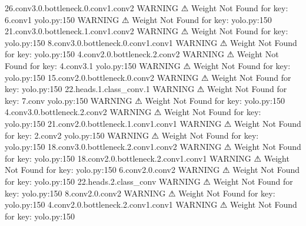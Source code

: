                              26.conv3.0.bottleneck.0.conv1.conv2                  
                    WARNING  ⚠ Weight Not Found for key: 6.conv1       yolo.py:150
                    WARNING  ⚠ Weight Not Found for key:               yolo.py:150
                             21.conv3.0.bottleneck.1.conv1.conv2                  
                    WARNING  ⚠ Weight Not Found for key:               yolo.py:150
                             8.conv3.0.bottleneck.0.conv1.conv1                   
                    WARNING  ⚠ Weight Not Found for key:               yolo.py:150
                             4.conv2.0.bottleneck.2.conv2                         
                    WARNING  ⚠ Weight Not Found for key: 4.conv3.1     yolo.py:150
                    WARNING  ⚠ Weight Not Found for key:               yolo.py:150
                             15.conv2.0.bottleneck.0.conv2                        
                    WARNING  ⚠ Weight Not Found for key:               yolo.py:150
                             22.heads.1.class_conv.1                              
                    WARNING  ⚠ Weight Not Found for key: 7.conv        yolo.py:150
                    WARNING  ⚠ Weight Not Found for key:               yolo.py:150
                             4.conv3.0.bottleneck.2.conv2                         
                    WARNING  ⚠ Weight Not Found for key:               yolo.py:150
                             21.conv2.0.bottleneck.1.conv1.conv1                  
                    WARNING  ⚠ Weight Not Found for key: 2.conv2       yolo.py:150
                    WARNING  ⚠ Weight Not Found for key:               yolo.py:150
                             18.conv3.0.bottleneck.2.conv1.conv2                  
                    WARNING  ⚠ Weight Not Found for key:               yolo.py:150
                             18.conv2.0.bottleneck.2.conv1.conv1                  
                    WARNING  ⚠ Weight Not Found for key:               yolo.py:150
                             6.conv2.0.conv2                                      
                    WARNING  ⚠ Weight Not Found for key:               yolo.py:150
                             22.heads.2.class_conv                                
                    WARNING  ⚠ Weight Not Found for key:               yolo.py:150
                             8.conv2.0.conv2                                      
                    WARNING  ⚠ Weight Not Found for key:               yolo.py:150
                             4.conv2.0.bottleneck.2.conv1.conv1                   
                    WARNING  ⚠ Weight Not Found for key:               yolo.py:150
